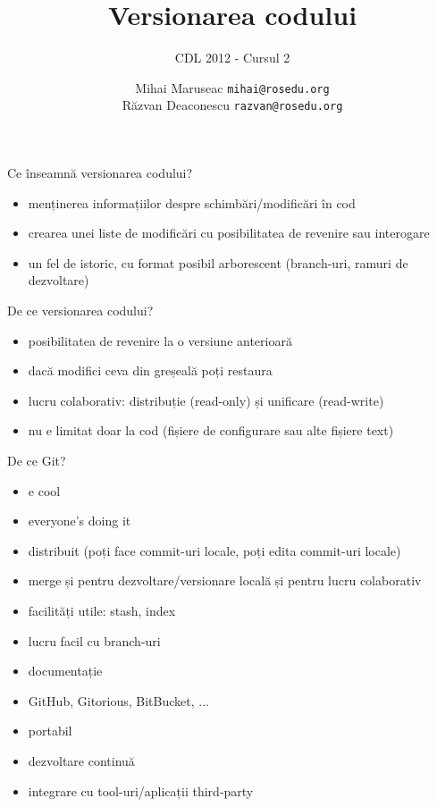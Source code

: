 \documentclass{beamer}
\title[]{Versionarea codului}
\subtitle{CDL 2012 - Cursul 2}
\institute[]{ROSEdu}
\author[]{
  Mihai Maruseac \texttt{mihai@rosedu.org} \\
  Răzvan Deaconescu \texttt{razvan@rosedu.org}
}
\begin{document}
\maketitle

\begin{frame}{Ce înseamnă versionarea codului?}
  \begin{itemize}
    \item menținerea informațiilor despre schimbări/modificări în cod
    \item crearea unei liste de modificări cu posibilitatea de revenire sau
      interogare
    \item un fel de istoric, cu format posibil arborescent (branch-uri,
      ramuri de dezvoltare)
  \end{itemize}
\end{frame}

\begin{frame}{De ce versionarea codului?}
  \begin{itemize}
    \item posibilitatea de revenire la o versiune anterioară
    \item dacă modifici ceva din greșeală poți restaura
    \item lucru colaborativ: distribuție (read-only) și unificare (read-write)
    \item nu e limitat doar la cod (fișiere de configurare sau alte fișiere text)
  \end{itemize}
\end{frame}

\begin{frame}{De ce Git?}
  \begin{itemize}
    \item e cool
    \item everyone's doing it
    \item distribuit (poți face commit-uri locale, poți edita commit-uri
      locale)
    \item merge și pentru dezvoltare/versionare locală și pentru lucru
      colaborativ
    \item facilități utile: stash, index
    \item lucru facil cu branch-uri
    \item documentație
    \item GitHub, Gitorious, BitBucket, ...
    \item portabil
    \item dezvoltare continuă
    \item integrare cu tool-uri/aplicații third-party
  \end{itemize}
\end{frame}
\end{document}
